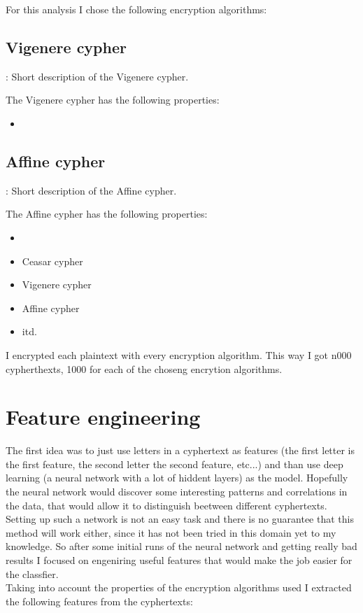 \documentclass[a4paper]{article}
\begin{document}
For this analysis I chose the following encryption algorithms:

\subsection{Vigenere cypher}
\TODO: Short description of the Vigenere cypher.

The Vigenere cypher has the following properties:

\begin{itemize}
	\item 
\end{itemize}

\subsection{Affine cypher}
\TODO: Short description of the Affine cypher.

The Affine cypher has the following properties:

\begin{itemize}
	\item 
\end{itemize}


\begin{itemize}
	\item Ceasar cypher
	\item Vigenere cypher
	\item Affine cypher
	\item itd.
\end{itemize}

I encrypted each plaintext with every encryption algorithm. This way I got n000 cypherthexts, 1000 for each of the choseng encrytion algorithms.

\section*{Feature engineering}
The first idea was to just use letters in a cyphertext as features (the first letter is the first feature, the second letter the second feature, etc...) and than use deep learning (a neural network with a lot of hiddent layers) as the model. Hopefully the neural network would discover some interesting patterns and correlations in the data, that would allow it to distinguish beetween different cyphertexts. Setting up such a network is not an easy task and there is no guarantee that this method will work either, since it has not been tried in this domain yet to my knowledge. So after some initial runs of the neural network and getting really bad results I focused on engeniring useful features that would make the job easier for the classfier. \\
Taking into account the properties of the encryption algorithms used I extracted the following features from the cyphertexts:
\end{document}
